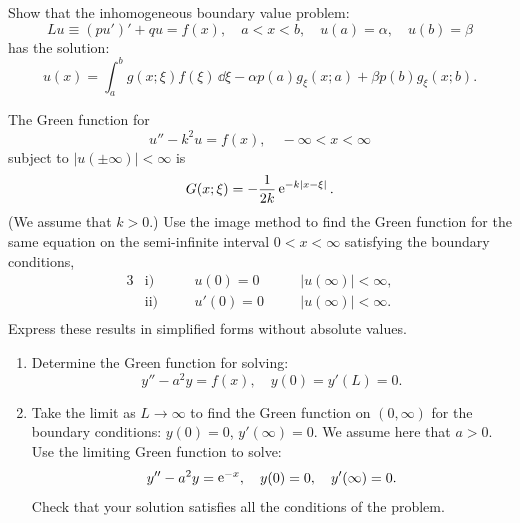 {\begin{Exercise}
\end{Exercise}








\begin{Exercise}
  \label{exercise Lu=pu+qu=f}
  Show that the inhomogeneous boundary value problem:
  \[
  L u \equiv (p u')' + q u = f(x), \quad a < x < b, \quad
  u(a) = \alpha, \quad u(b) = \beta
  \]
  has the solution:
  \[
  u(x) = \int_a^b g(x;\xi) f(\xi)\,\dd \xi - \alpha p(a) g_\xi(x;a)
  + \beta p(b) g_\xi(x;b).
  \]

\end{Exercise}







\begin{Exercise}
  \label{exercise u-k2u=f}
  The Green function for 
  \[
  u'' - k^2 u = f(x), \quad -\infty < x < \infty
  \]
  subject to $|u(\pm \infty)| < \infty$ is 
  \[
  G(x;\xi) = - \frac{1}{2k} \mathop{\mathrm{e}}\nolimits^{-k|x-\xi|}.
  \]
  (We assume that $k>0$.)  Use the image method to find the Green function for 
  the same equation on the semi-infinite interval $0 < x < \infty$ satisfying
  the boundary conditions,
  \begin{alignat*}{3}
    &\mathrm{i)} &\quad &u(0) = 0 &\quad &|u(\infty)| < \infty, \\
    &\mathrm{ii)} &\quad &u'(0) = 0 &\quad &|u(\infty)| < \infty. \\
  \end{alignat*}
  Express these results in simplified forms without absolute values.

\end{Exercise}





\begin{Exercise}
  \label{exercise y-a2y=f}
  \begin{enumerate}
  \item
    Determine the Green function for solving:
    \[
    y'' - a^2 y = f(x), \quad y(0) = y'(L) = 0.
    \]
  \item
    Take the limit as $L \to \infty$ to find the Green function on $(0,\infty)$
    for the boundary conditions: $y(0) = 0$, $y'(\infty) = 0$.  We assume here 
    that $a > 0$.  Use the limiting Green function to solve:
    \[
    y'' - a^2 y = \mathop{\mathrm{e}}\nolimits^{-x}, \quad y(0) = 0, \quad y'(\infty) = 0.
    \]
    Check that your solution satisfies all the conditions of the problem.
  \end{enumerate}

\end{Exercise}








\raggedbottom
}
